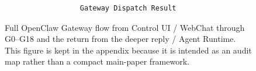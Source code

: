 \begin{landscape}
\begin{figure}[p]
\begin{verbatim}
                  Gateway Dispatch Result

\end{verbatim}

\caption{
Full OpenClaw Gateway flow from Control UI / WebChat through G0--G18 and
the return from the deeper reply / Agent Runtime. This figure is kept in
the appendix because it is intended as an audit map rather than a compact
main-paper framework.
}
\label{fig:gateway-g0-g18-full-landscape}

\end{figure}

\end{landscape}

\clearpage

\begin{figure}[p]
\centering
{\ttfamily\fontsize{5}{5.2}\selectfont

}
\end{figure}
